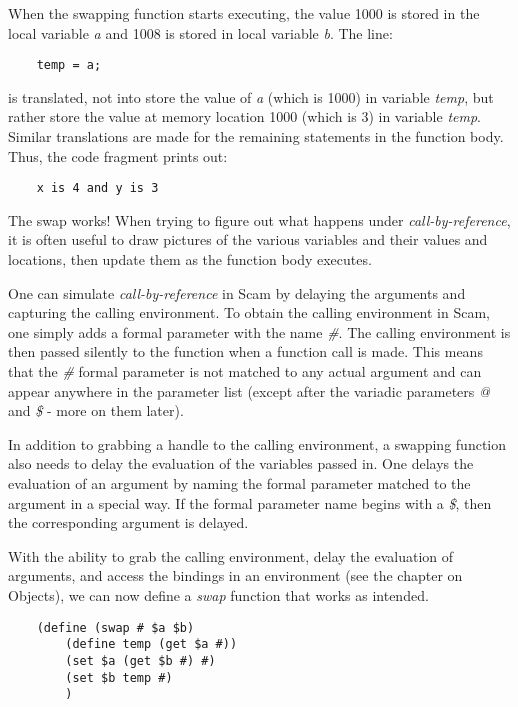 When the swapping function starts executing, the value 1000 is stored
in the local variable {\it a} and 1008 is stored in local variable {\it b}.
The line:

\begin{verbatim}
    temp = a;
\end{verbatim}

is translated, not into store the value of {\it a} (which is 1000) in
variable {\it temp}, but rather store the value at memory location 1000 (which
is 3) in variable {\it temp}. Similar translations are made for the remaining
statements in the function body. Thus, the code fragment prints out:

\begin{verbatim}
    x is 4 and y is 3
\end{verbatim}

The swap works! When trying to figure out what happens under
{\it call-by-reference}, it is often useful to draw pictures of the various
variables and their values and locations, then update them as the function
body executes.

One can simulate {\it call-by-reference} in Scam by delaying the arguments
and capturing the calling environment.
To obtain the
calling environment in Scam,
one simply adds a formal parameter with the name {\it \#}.
The calling environment is then passed silently to the
function when a function call is made. This means that
the {\it \#} formal parameter is not matched to any actual argument
and can appear anywhere in the parameter list (except after
the variadic parameters {\it @} and {\it \$} - more on them later).

In addition to grabbing a handle to the calling environment,
a swapping function also needs to delay the evaluation of
the variables passed in.
One delays the evaluation of an argument by naming the formal
parameter matched to the argument in a special way. If the
formal parameter name begins with a {\it \$}, then
the corresponding argument is delayed.

With the ability to grab the calling environment,
delay the evaluation of arguments, and access the
bindings in an environment (see the chapter on Objects),
we can now define a {\it swap} function that works as intended.

\begin{verbatim}
    (define (swap # $a $b)
        (define temp (get $a #))
        (set $a (get $b #) #)
        (set $b temp #)
        )
\end{verbatim}

